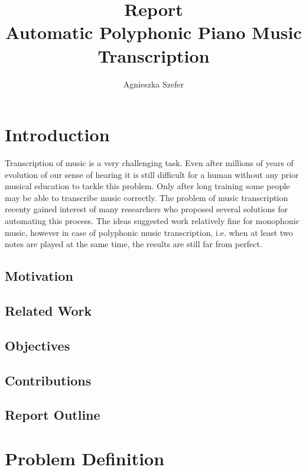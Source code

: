 \documentclass[11pt]{article} %
\title{Report \\ Automatic Polyphonic Piano Music Transcription}
\author{Agnieszka Szefer}
\begin{document}
\newcommand{\myparagraph}[1]{\paragraph{#1}\mbox{}\\}
\maketitle

\tableofcontents

\section{Introduction}
Transcription of music is a very challenging task. Even after millions of years of evolution of our sense of hearing it is still difficult for a human without any prior musical education to tackle this problem. Only after long training some people may be able to transcribe music correctly. The problem of music transcription recenty gained interest of many researchers who proposed several solutions for automating this process. The ideas suggested work relatively fine for monophonic music, however in case of polyphonic music transcription, i.e. when at least two notes are played at the same time,  the results are still far from perfect.

\subsection{Motivation}
\subsection{Related Work}
\subsection{Objectives}
\subsection{Contributions}
\subsection{Report Outline}


\section{Problem Definition}
\end{document}
